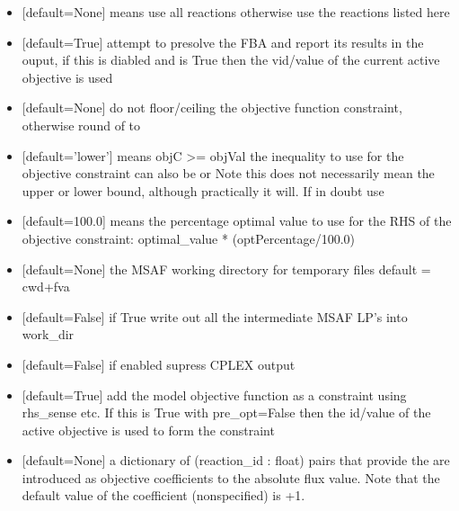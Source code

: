 \documentclass[letterpaper,10pt,english]{sphinxmanual}
\begin{document}
\begin{fulllineitems}
\begin{itemize}
\item {} 
\sphinxAtStartPar
{} {[}default=None{]} means use all reactions otherwise use the reactions listed here

\item {} 
\sphinxAtStartPar
{} {[}default=True{]} attempt to presolve the FBA and report its results in the ouput, if this is diabled and  is True then the vid/value of the current active objective is used

\item {} 
\sphinxAtStartPar
{}  {[}default=None{]} do not floor/ceiling the objective function constraint, otherwise round of to 

\item {} 
\sphinxAtStartPar
{} {[}default=’lower’{]} means objC \textgreater{}= objVal the inequality to use for the objective constraint can also be  or 
Note this does not necessarily mean the upper or lower bound, although practically it will. If in doubt use 

\item {} 
\sphinxAtStartPar
{} {[}default=100.0{]} means the percentage optimal value to use for the RHS of the objective constraint: optimal\_value * (optPercentage/100.0)

\item {} 
\sphinxAtStartPar
{} {[}default=None{]} the MSAF working directory for temporary files default = cwd+fva

\item {} 
\sphinxAtStartPar
{} {[}default=False{]} if True write out all the intermediate MSAF LP’s into work\_dir

\item {} 
\sphinxAtStartPar
{} {[}default=False{]} if enabled supress CPLEX output

\item {} 
\sphinxAtStartPar
{} {[}default=True{]} add the model objective function as a constraint using rhs\_sense etc. If
this is True with pre\_opt=False then the id/value of the active objective is used to form the constraint

\item {} 
\sphinxAtStartPar
{} {[}default=None{]} a dictionary of (reaction\_id : float) pairs that provide the are introduced as objective coefficients to the absolute flux value. Note that the default value of the coefficient (non\sphinxhyphen{}specified) is +1.


\end{itemize}
\end{fulllineitems}
\end{document}
